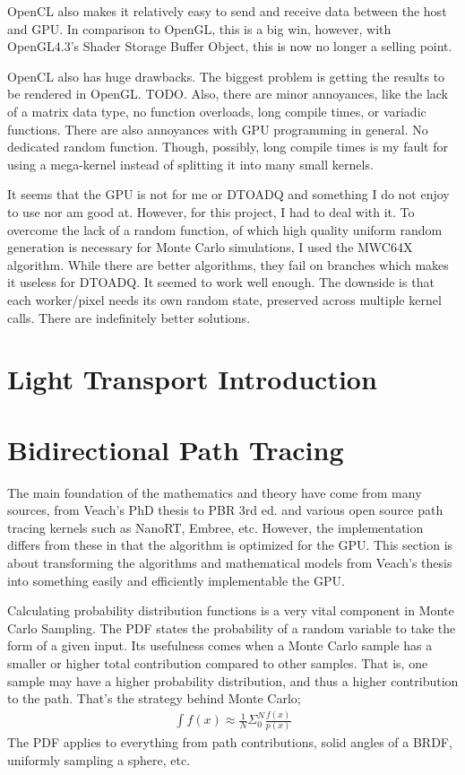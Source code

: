 \documentclass{article}
\begin{document}
  	OpenCL also makes it relatively easy to send and receive data between the host and GPU. In comparison to OpenGL, this is a big win, however, with OpenGL4.3's Shader Storage Buffer Object, this is now no longer a selling point.
  	
  	OpenCL also has huge drawbacks. The biggest problem is getting the results to be rendered in OpenGL. TODO. Also, there are minor annoyances, like the lack of a matrix data type, no function overloads, long compile times, or variadic functions. There are also annoyances with GPU programming in general. No dedicated random function. Though, possibly, long compile times is my fault for using a mega-kernel instead of splitting it into many small kernels.
  	
  	It seems that the GPU is not for me or DTOADQ and something I do not enjoy to use nor am good at. However, for this project, I had to deal with it. To overcome the lack of a random function, of which high quality uniform random generation is necessary for Monte Carlo simulations, I used the MWC64X algorithm. While there are better algorithms, they fail on branches which makes it useless for DTOADQ. It seemed to work well enough. The downside is that each worker/pixel needs its own random state, preserved across multiple kernel calls. There are indefinitely better solutions.
  \section{Light Transport Introduction}
  \section{Bidirectional Path Tracing}
    The main foundation of the mathematics and theory have come from many sources, from Veach's PhD thesis to PBR 3rd ed. and various open source path tracing kernels such as NanoRT, Embree, etc. However, the implementation differs from these in that the algorithm is optimized for the GPU. This section is about transforming the algorithms and mathematical models from Veach's thesis into something easily and efficiently implementable the GPU.

    Calculating probability distribution functions is a very vital component in
    Monte Carlo Sampling. The PDF states the probability of a random variable to
    take the form of a given input. Its usefulness comes when a Monte Carlo sample has a smaller or higher total contribution compared to other samples. That is, one sample may
    have a higher probability distribution, and thus a higher contribution to
    the path. That's the strategy behind Monte Carlo;
    \begin{align}
      \int f(x) \approx \frac{1}{N}\Sigma_0^N\frac{f(x)}{p(x)}
    \end{align}
    The PDF applies to everything from path contributions, solid angles of a
    BRDF, uniformly sampling a sphere, etc.
    
\end{document}
